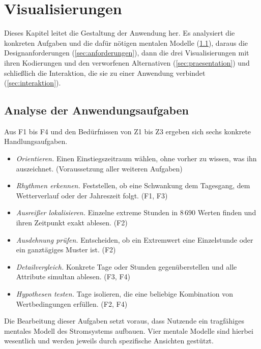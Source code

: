 \section{Visualisierungen}

Dieses Kapitel leitet die Gestaltung der Anwendung her. Es analysiert die konkreten Aufgaben und die dafür nötigen
mentalen Modelle (\ref{sec:aufgaben}), daraus die Designanforderungen (\ref{sec:anforderungen}),
dann die drei Visualisierungen mit ihren Kodierungen und den verworfenen Alternativen
(\ref{sec:praesentation}) und schließlich die Interaktion, die sie zu einer Anwendung verbindet
(\ref{sec:interaktion}).

\subsection{Analyse der Anwendungsaufgaben}\label{sec:aufgaben}

Aus F1 bis F4 und den Bedürfnissen von Z1 bis Z3 ergeben sich sechs konkrete Handlungsaufgaben.

\begin{itemize}
  \item[\textbf{A1}] \emph{Orientieren.} Einen Einstiegszeitraum wählen, ohne vorher zu wissen, was
        ihn auszeichnet. (Voraussetzung aller weiteren Aufgaben)
  \item[\textbf{A2}] \emph{Rhythmen erkennen.} Feststellen, ob eine Schwankung dem Tagesgang, dem
        Wetterverlauf oder der Jahreszeit folgt. (F1, F3)
  \item[\textbf{A3}] \emph{Ausreißer lokalisieren.} Einzelne extreme Stunden in $8\,690$ Werten
        finden und ihren Zeitpunkt exakt ablesen. (F2)
  \item[\textbf{A4}] \emph{Ausdehnung prüfen.} Entscheiden, ob ein Extremwert eine Einzelstunde
        oder ein ganztägiges Muster ist. (F2)
  \item[\textbf{A5}] \emph{Detailvergleich.} Konkrete Tage oder Stunden gegenüberstellen und alle
        Attribute simultan ablesen. (F3, F4)
  \item[\textbf{A6}] \emph{Hypothesen testen.} Tage isolieren, die eine beliebige Kombination von
        Wertbedingungen erfüllen. (F2, F4)
\end{itemize}

Die Bearbeitung dieser Aufgaben setzt voraus, dass Nutzende ein tragfähiges mentales Modell des Stromsystems aufbauen. Vier mentale Modelle sind hierbei wesentlich und werden jeweils durch spezifische Ansichten gestützt.

